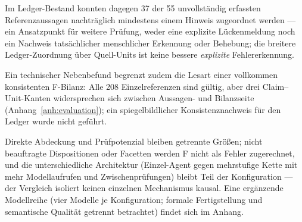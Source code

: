 Im Ledger-Bestand konnten dagegen 37 der 55 unvollständig erfassten
Referenzaussagen nachträglich mindestens einem Hinweis zugeordnet
werden --- ein Ansatzpunkt für weitere Prüfung, weder eine
explizite Lückenmeldung noch ein Nachweis tatsächlicher
menschlicher Erkennung oder Behebung; die breitere
Ledger-Zuordnung über Quell-Units ist keine bessere
\emph{explizite} Fehlererkennung.

Ein technischer Nebenbefund
begrenzt zudem die Lesart einer vollkommen konsistenten
F-Bilanz: Alle 208 Einzelreferenzen sind gültig, aber drei
Claim--Unit-Kanten widersprechen sich zwischen Aussagen- und
Bilanzseite (Anhang~\ref{anh:evaluation}); ein spiegelbildlicher
Konsistenznachweis für den Ledger wurde nicht geführt.

Direkte Abdeckung und Prüfpotenzial bleiben getrennte Größen; nicht
beauftragte Dispositionen oder Facetten werden F nicht als Fehler
zugerechnet, und die unterschiedliche Architektur (Einzel-Agent
gegen mehrstufige Kette mit mehr Modellaufrufen und
Zwischenprüfungen) bleibt Teil der Konfiguration --- der
Vergleich isoliert keinen einzelnen Mechanismus kausal. Eine
ergänzende Modellreihe (vier Modelle je Konfiguration; formale
Fertigstellung und semantische Qualität getrennt betrachtet)
findet sich im Anhang.
